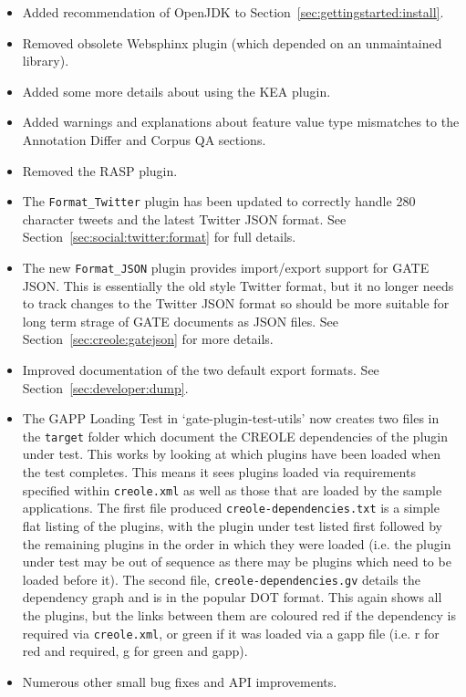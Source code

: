 \begin{itemize}
\item Added recommendation of OpenJDK to
  Section~\ref{sec:gettingstarted:install}.
\item Removed obsolete Websphinx plugin (which depended on an unmaintained
  library).
\item Added some more details about using the KEA plugin.
\item Added warnings and explanations about feature value type mismatches to the
  Annotation Differ and Corpus QA sections.
\item Removed the RASP plugin.
\item The \verb!Format_Twitter! plugin has been updated to correctly handle 280
  character tweets and the latest Twitter JSON format. See
  Section~\ref{sec:social:twitter:format} for full details.
\item The new \verb!Format_JSON! plugin provides import/export support for GATE
  JSON.  This is essentially the old style Twitter format, but it no longer
  needs to track changes to the Twitter JSON format so should be more suitable
  for long term strage of GATE documents as JSON files. See
  Section~\ref{sec:creole:gatejson} for more details.
\item Improved documentation of the two default export formats. See
  Section~\ref{sec:developer:dump}.
\item The GAPP Loading Test in `gate-plugin-test-utils' now creates two files
  in the \verb!target! folder which document the CREOLE dependencies of the
  plugin under test. This works by looking at which plugins have been loaded
  when the test completes. This means it sees plugins loaded via requirements
  specified within \verb!creole.xml! as well as those that are loaded by the
  sample applications. The first file produced \verb!creole-dependencies.txt!
  is a simple flat listing of the plugins, with the plugin under test listed
  first followed by the remaining plugins in the order in which they were
  loaded (i.e. the plugin under test may be out of sequence as there may be
  plugins which need to be loaded before it). The second file,
  \verb!creole-dependencies.gv! details the dependency graph and is in the
  popular DOT format. This again shows all the plugins, but the links between
  them are coloured red if the dependency is required via \verb!creole.xml!,
  or green if it was loaded via a gapp file (i.e. r for red and required, g for
  green and gapp).
\item Numerous other small bug fixes and API improvements.
\end{itemize}

